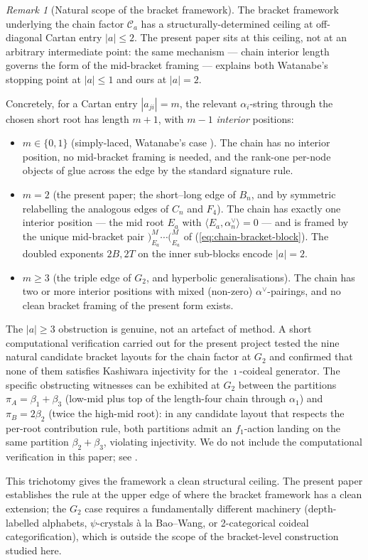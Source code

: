\documentclass[11pt]{article}
\theoremstyle{definition}
\theoremstyle{remark}
\newtheorem{remark}[theorem]{Remark}
\newcommand{\Cmid}{\mathcal{C}}
\newcommand{\labr}[1]{{)}_{#1}}
\newcommand{\labl}[1]{{(}_{#1}}
\begin{document}
\begin{remark}[Natural scope of the bracket framework]\label{rmk:scope}
The bracket framework underlying the chain factor $\Cmid_a$ has a structurally-determined
ceiling at off-diagonal Cartan entry $|a| \leq 2$. The present paper sits at this ceiling,
not at an arbitrary intermediate point: the same mechanism --- chain interior length
governs the form of the mid-bracket framing --- explains both Watanabe's stopping point at
$|a| \leq 1$ and ours at $|a| = 2$.

Concretely, for a Cartan entry $|a_{ji}| = m$, the relevant $\alpha_i$-string through the
chosen short root has length $m + 1$, with $m - 1$ \emph{interior} positions:
\begin{itemize}[leftmargin=2em]
  \item $m \in \{0, 1\}$ (simply-laced, Watanabe's case
    \cite[Prop.~5.1.1]{Watanabe2110}). The chain has no interior position, no mid-bracket
    framing is needed, and the rank-one per-node objects of \cite[\S4.1]{Watanabe2110}
    glue across the edge by the standard signature rule.
  \item $m = 2$ (the present paper; the short--long edge of $B_n$, and by symmetric
    relabelling the analogous edges of $C_n$ and $F_4$). The chain has exactly one
    interior position --- the mid root $E_a$ with $\langle E_a, \alpha_n^\vee\rangle = 0$
    --- and is framed by the unique mid-bracket pair $\labr{E_a}^M \cdots \labl{E_a}^M$
    of (\ref{eq:chain-bracket-block}). The doubled exponents $2B, 2T$ on the inner
    sub-blocks encode $|a| = 2$.
  \item $m \geq 3$ (the triple edge of $G_2$, and hyperbolic generalisations). The chain
    has two or more interior positions with mixed (non-zero) $\alpha^\vee$-pairings, and
    no clean bracket framing of the present form exists.
\end{itemize}

The $|a| \geq 3$ obstruction is genuine, not an artefact of method. A short computational
verification carried out for the present project tested the nine natural candidate
bracket layouts for the chain factor at $G_2$ and confirmed that none of them satisfies
Kashiwara injectivity for the $\imath$-coideal generator. The specific obstructing
witnesses can be exhibited at $G_2$ between the partitions $\pi_A = \beta_1 + \beta_3$
(low-mid plus top of the length-four chain through $\alpha_1$) and $\pi_B = 2\beta_2$
(twice the high-mid root): in any candidate layout that respects the per-root contribution
rule, both partitions admit an $f_1$-action landing on the same partition $\beta_2 +
\beta_3$, violating injectivity. We do not include the computational verification in
this paper; see \cite{ScopeNote}.

This trichotomy gives the framework a clean structural ceiling. The present paper
establishes the rule at the upper edge of where the bracket framework has a clean
extension; the $G_2$ case requires a fundamentally different machinery (depth-labelled
alphabets, $\psi$-crystals \`a la Bao--Wang, or 2-categorical coideal categorification),
which is outside the scope of the bracket-level construction studied here.
\end{remark}
\end{document}
